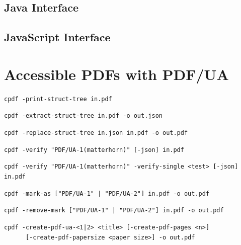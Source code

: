 \documentclass{book}
\begin{document}
\begin{jcpdflib}
\clearpage
\section*{Java Interface}
\begin{small}\tt

\end{small}
\end{jcpdflib}

\begin{jscpdflib}
\clearpage
\section*{JavaScript Interface}
\begin{small}\tt

\end{small}
\end{jscpdflib}

\clearpage\pagestyle{empty}
\chapter{Accessible PDFs with PDF/UA}\label{chap:19}\pagestyle{fancy}

  {\small\begin{framed}
  \noindent\verb!cpdf -print-struct-tree in.pdf!

  \vspace{1.5mm}
  \noindent\verb!cpdf -extract-struct-tree in.pdf -o out.json!

  \vspace{1.5mm}
  \noindent\verb!cpdf -replace-struct-tree in.json in.pdf -o out.pdf!

  \vspace{1.5mm}
  \noindent\verb!cpdf -verify "PDF/UA-1(matterhorn)" [-json] in.pdf!

  \vspace{1.5mm}
  \noindent\verb!cpdf -verify "PDF/UA-1(matterhorn)" -verify-single <test> [-json] in.pdf!

  \vspace{1.5mm}
  \noindent\verb!cpdf -mark-as ["PDF/UA-1" | "PDF/UA-2"] in.pdf -o out.pdf!

  \vspace{1.5mm}
  \noindent\verb!cpdf -remove-mark ["PDF/UA-1" | "PDF/UA-2"] in.pdf -o out.pdf!

  \vspace{1.5mm}
  \noindent\verb!cpdf -create-pdf-ua-<1|2> <title> [-create-pdf-pages <n>]!\\
  \noindent\verb!      [-create-pdf-papersize <paper size>] -o out.pdf!

  \end{framed}}
\end{document}
